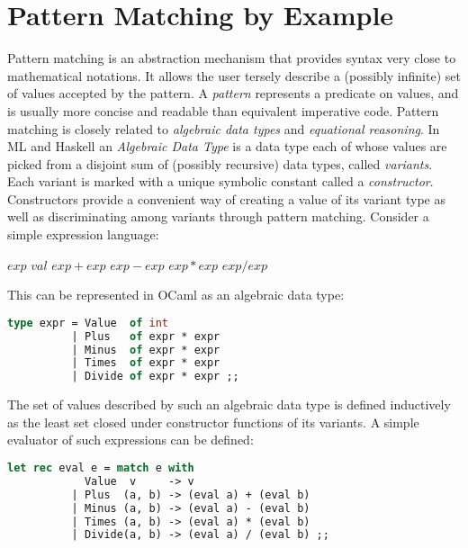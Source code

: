 \section{Pattern Matching by Example} %
\label{sec:bg}

Pattern matching is an abstraction mechanism that provides syntax very close to 
mathematical notations. It allows the user tersely describe a (possibly 
infinite) set of values accepted by the pattern. A \emph{pattern} represents a 
predicate on values, and is usually more concise and readable than equivalent 
imperative code. Pattern matching is closely related to \emph{algebraic data 
types} and \emph{equational reasoning}. 
In ML and Haskell an \emph{Algebraic Data Type} is a data type 
each of whose values are picked from a disjoint sum of (possibly recursive) data 
types, called \emph{variants}. Each variant is marked with a unique 
symbolic constant called a \emph{constructor}. Constructors provide a convenient 
way of creating a value of its variant type as well as discriminating among 
variants through pattern matching. Consider a simple expression language:
\begin{center}
$exp$ \is{} $val$ \Alt{} $exp+exp$ \Alt{} $exp-exp$ \Alt{} $exp*exp$ \Alt{} $exp/exp$
\end{center}

\noindent
This can be represented in OCaml as an algebraic data type:

\begin{lstlisting}[language=Caml,keepspaces,columns=flexible]
type expr = Value  of int 
          | Plus   of expr * expr 
          | Minus  of expr * expr 
          | Times  of expr * expr 
          | Divide of expr * expr ;;
\end{lstlisting}

\noindent
The set of values described by such an algebraic data type is defined 
inductively as the least set closed under constructor functions of its variants.
A simple evaluator of such expressions can be defined:

\begin{lstlisting}[language=Caml,keepspaces,columns=flexible]
let rec eval e = match e with 
            Value  v     -> v 
          | Plus  (a, b) -> (eval a) + (eval b) 
          | Minus (a, b) -> (eval a) - (eval b)
          | Times (a, b) -> (eval a) * (eval b) 
          | Divide(a, b) -> (eval a) / (eval b) ;;
\end{lstlisting}

